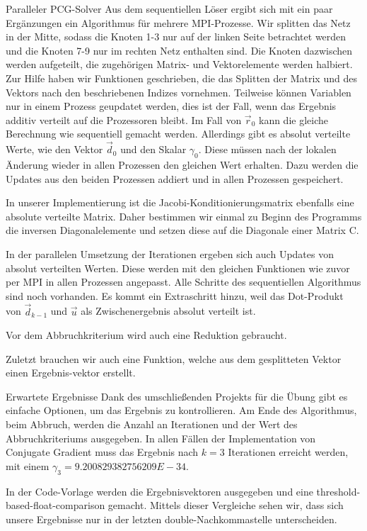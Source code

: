\documentclass[
ngerman,
subtask=ruled %
]{tudaexercise}
\begin{document}
	\begin{task}{Paralleler PCG-Solver}
		Aus dem sequentiellen Löser ergibt sich mit ein paar Ergänzungen ein Algorithmus für mehrere MPI-Prozesse.
		Wir splitten das Netz in der Mitte, sodass die Knoten 1-3 nur auf der linken Seite betrachtet werden und die Knoten 7-9 nur im rechten Netz enthalten sind. Die Knoten dazwischen werden aufgeteilt, die zugehörigen Matrix- und Vektorelemente werden halbiert.
		Zur Hilfe haben wir Funktionen geschrieben, die das Splitten der Matrix und des Vektors nach den beschriebenen Indizes vornehmen. Teilweise können Variablen nur in einem Prozess geupdatet werden, dies ist der Fall, wenn das Ergebnis additiv verteilt auf die Prozessoren bleibt. Im Fall von $\vec{r}_0$ kann die gleiche Berechnung wie sequentiell gemacht werden.
		Allerdings gibt es absolut verteilte Werte, wie den Vektor $\vec{d}_0$ und den Skalar $\gamma_0$. Diese müssen nach der lokalen Änderung wieder in allen Prozessen den gleichen Wert erhalten. Dazu werden die Updates aus den beiden Prozessen addiert und in allen Prozessen gespeichert.
		
		In unserer Implementierung ist die Jacobi-Konditionierungsmatrix ebenfalls eine absolute verteilte Matrix. Daher bestimmen wir einmal zu Beginn des Programms die inversen Diagonalelemente und setzen diese auf die Diagonale einer Matrix C.
		
		In der parallelen Umsetzung der Iterationen ergeben sich auch Updates von absolut verteilten Werten. Diese werden mit den gleichen Funktionen wie zuvor per MPI in allen Prozessen angepasst. Alle Schritte des sequentiellen Algorithmus sind noch vorhanden. Es kommt ein Extraschritt hinzu, weil das Dot-Produkt von $\vec{d}_{k-1}$ und $\vec{u}$ als Zwischenergebnis absolut verteilt ist.
		
		Vor dem Abbruchkriterium wird auch eine Reduktion gebraucht.
		
		Zuletzt brauchen wir auch eine Funktion, welche aus dem gesplitteten Vektor einen Ergebnis-vektor erstellt.
	\end{task}	

	\begin{task}{Erwartete Ergebnisse}
		Dank des umschließenden Projekts für die Übung gibt es einfache Optionen, um das Ergebnis zu kontrollieren.
		Am Ende des Algorithmus, beim Abbruch, werden die Anzahl an Iterationen und der Wert des Abbruchkriteriums ausgegeben.
		In allen Fällen der Implementation von Conjugate Gradient muss das Ergebnis nach $k = 3$ Iterationen erreicht werden, mit einem $\gamma_3 = 9.200829382756209 E -34$.
		
		In der Code-Vorlage werden die Ergebnisvektoren ausgegeben und eine threshold-based-float-comparison gemacht. Mittels dieser Vergleiche sehen wir, dass sich unsere Ergebnisse nur in der letzten double-Nachkommastelle unterscheiden.
	\end{task}	
\end{document}
